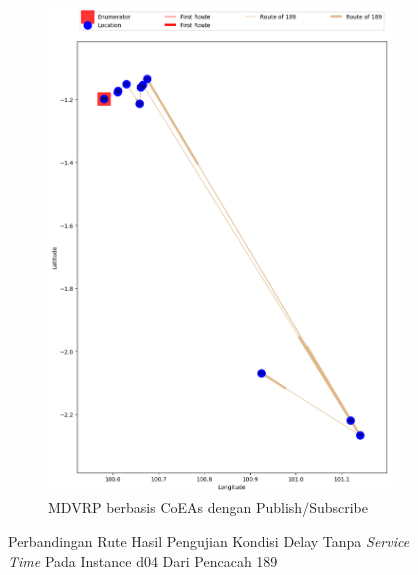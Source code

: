 \begin{figure}[H]\ContinuedFloat
	\centering
	\begin{subfigure}[t]{\textwidth}
		\centering
		\includegraphics[width=\textwidth]{Resources/Images/delayed_4/real_m15_n100_delayed_4_189_pubsub_coes}
		\caption{MDVRP berbasis CoEAs dengan Publish/Subscribe}
		\label{fig:real_m15_n100_delayed_4_189_pubsub_coes}
	\end{subfigure}
	\caption{Perbandingan Rute Hasil Pengujian Kondisi Delay Tanpa \textit{Service Time} Pada Instance d04 Dari Pencacah 189}
	\label{fig:real_m15_n100_delayed_4_189_contd}
\end{figure}



